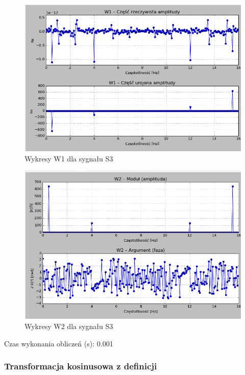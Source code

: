 \documentclass{article}
\begin{document}
{                \FloatBarrier
                \begin{figure}[h!]
                    \centering
                    \includegraphics[width=1\textwidth]{img/w1s3_2.png}
                    \caption{Wykresy W1 dla sygnału S3}
                \end{figure}

                \begin{figure}[h!]
                    \centering
                    \includegraphics[width=1\textwidth]{img/w2s3_2.png}
                    \caption{Wykresy W2 dla sygnału S3}
                \end{figure}
                \FloatBarrier

                Czas wykonania obliczeń (s): 0.001

            \subsubsection{Transformacja kosinusowa z definicji}

}
\end{document}
